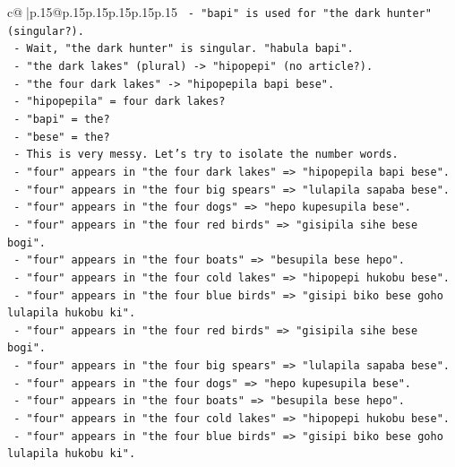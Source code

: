 \documentclass{article}
\begin{document}
{\begin{supertabular}{c@{$\;$}|p{.15\linewidth}@{}p{.15\linewidth}p{.15\linewidth}p{.15\linewidth}p{.15\linewidth}p{.15\linewidth}}
{{{\texttt{           {-} "bapi" is used for "the dark hunter" (singular?).} \\
\texttt{           {-} Wait, "the dark hunter" is singular. "habula bapi".} \\
\texttt{           {-} "the dark lakes" (plural) {-}> "hipopepi" (no article?).} \\
\texttt{           {-} "the four dark lakes" {-}> "hipopepila bapi bese".} \\
\texttt{           {-} "hipopepila" = four dark lakes?} \\
\texttt{           {-} "bapi" = the?} \\
\texttt{           {-} "bese" = the?} \\
\texttt{           {-} This is very messy. Let's try to isolate the number words.} \\
\texttt{           {-} "four" appears in "the four dark lakes" => "hipopepila bapi bese".} \\
\texttt{           {-} "four" appears in "the four big spears" => "lulapila sapaba bese".} \\
\texttt{           {-} "four" appears in "the four dogs" => "hepo kupesupila bese".} \\
\texttt{           {-} "four" appears in "the four red birds" => "gisipila sihe bese bogi".} \\
\texttt{           {-} "four" appears in "the four boats" => "besupila bese hepo".} \\
\texttt{           {-} "four" appears in "the four cold lakes" => "hipopepi hukobu bese".} \\
\texttt{           {-} "four" appears in "the four blue birds" => "gisipi biko bese goho lulapila hukobu ki".} \\
\texttt{           {-} "four" appears in "the four red birds" => "gisipila sihe bese bogi".} \\
\texttt{           {-} "four" appears in "the four big spears" => "lulapila sapaba bese".} \\
\texttt{           {-} "four" appears in "the four dogs" => "hepo kupesupila bese".} \\
\texttt{           {-} "four" appears in "the four boats" => "besupila bese hepo".} \\
\texttt{           {-} "four" appears in "the four cold lakes" => "hipopepi hukobu bese".} \\
\texttt{           {-} "four" appears in "the four blue birds" => "gisipi biko bese goho lulapila hukobu ki".} \\
}}}
\end{supertabular}}
\end{document}
